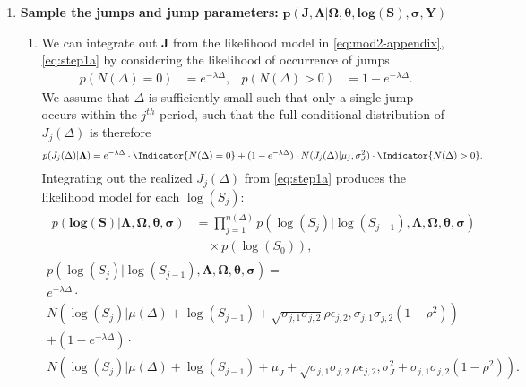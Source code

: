\begin{enumerate}
\item \textbf{Sample the jumps and jump parameters:} $\boldsymbol{p(J, \Lambda | \Omega, \theta, \mbox{log}(S), \sigma, Y)}$
  \begin{enumerate}
  \item We can integrate out $\boldsymbol{J}$ from the likelihood model in \eqref{eq:mod2-appendix}, \eqref{eq:step1a} by considering the likelihood of occurrence of jumps
    \begin{align*}
      p(N(\Delta) = 0) &= e^{-\lambda \Delta}, &  p(N(\Delta) > 0) &= 1 - e^{-\lambda \Delta}.
    \end{align*}
    We assume that $\Delta$ is sufficiently small such that only a single jump occurs within the $j^{th}$ period, such that the full conditional distribution of $J_j(\Delta)$ is therefore
    \begin{align*}
      p(J_j(\Delta) | \boldsymbol{\Lambda}) &=  e^{-\lambda \Delta}\cdot \Indicator{N(\Delta) = 0} + (1-e^{-\lambda \Delta})\cdot N(J_j(\Delta) | \mu_j, \sigma^2_J)\cdot \Indicator{N(\Delta) > 0}.
    \end{align*}
    Integrating out the realized $J_j(\Delta)$ from \eqref{eq:step1a} produces the likelihood model for each $\log(S_j):$
    \begin{align}
      \label{eq:step2a1}
      \begin{split}
        p(\boldsymbol{\mbox{log}(S)} | \boldsymbol{\Lambda}, \boldsymbol{\Omega}, \boldsymbol{\theta}, \boldsymbol{\sigma}) &= \prod_{j=1}^{n(\Delta)} p(\log(S_j) | \log(S_{j-1}), \boldsymbol{\Lambda}, \boldsymbol{\Omega}, \boldsymbol{\theta}, \boldsymbol{\sigma})\\
        & \quad \times p(\log(S_0)),
      \end{split}
    \end{align}
    \begin{multline}
      \label{eq:step2a2}
      p(\log(S_j) | \log(S_{j-1}), \boldsymbol{\Lambda}, \boldsymbol{\Omega}, \boldsymbol{\theta}, \boldsymbol{\sigma}) = \\
      e^{-\lambda\Delta}\cdot \\
      N\left(\log(S_j) | \mu(\Delta) + \log(S_{j-1}) + \sqrt{\sigma_{j,1}\sigma_{j,2}}\rho\epsilon_{j,2}, \sigma_{j,1}\sigma_{j,2}(1-\rho^2) \right) \\
      + (1-e^{-\lambda\Delta})\cdot \\
      N\left(\log(S_j) | \mu(\Delta) + \log(S_{j-1}) + \mu_J + \sqrt{\sigma_{j,1}\sigma_{j,2}}\rho\epsilon_{j,2}, \sigma_J^2 + \sigma_{j,1}\sigma_{j,2}(1-\rho^2) \right).

\end{multline}
\end{enumerate}
\end{enumerate}
